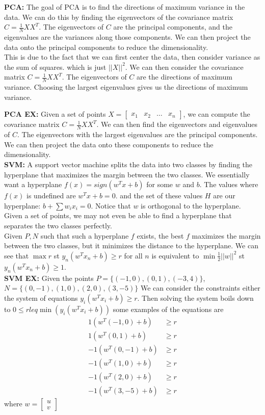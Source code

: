 \documentclass[answers,12pt,addpoints]{exam}
\begin{document}
\textbf{PCA:} The goal of PCA is to find the directions of maximum variance in the data. We can do this by finding the eigenvectors of the covariance matrix $C = \frac{1}{N} X X^T$. The eigenvectors of $C$ are the principal components, and the eigenvalues are the variances along those components. We can then project the data onto the principal components to reduce the dimensionality.\\
This is due to the fact that we can first center the data, then consider variance as the sum of squares. which is just $||X||^2$. We can then consider the covariance matrix $C = \frac{1}{N} X X^T$. The eigenvectors of $C$ are the directions of maximum variance. Choosing the largest eigenvalues gives us the directions of maximum variance. 

\textbf{PCA EX:} Given a set of points $X = \begin{bmatrix}
    x_1 & x_2 & \ldots & x_n
    \end{bmatrix}$, we can compute the covariance matrix $C = \frac{1}{N} X X^T$. We can then find the eigenvectors and eigenvalues of $C$. The eigenvectors with the largest eigenvalues are the principal components. We can then project the data onto these components to reduce the dimensionality.\\


\textbf{SVM:} A support vector machine splits the data into two classes by finding the hyperplane that maximizes the margin between the two classes. We essentially want a hyperplane $f(x) = sign(w^T x + b)$ for some $w$ and $b$. The values where $f(x)$ is undefined are $w^T x + b = 0$. and the set of these values $H$ are our hyperplane: $b + \sum w_i x_i = 0$. Notice that $w$ is orthogonal to the hyperplane. Given a set of points, we may not even be able to find a hyperplane that separates the two classes perfectly.\\
Given $P, N$ such that such a hyperplane $f$ exists, the best $f$ maximizes the margin between the two classes, but it minimizes the distance to the hyperplane. We can see that $\max r$ st $y_n (w^T x_n + b) \geq r$ for all $n$ is equivalent to $\min \frac{1}{2} ||w||^2$ st $y_n (w^T x_n + b) \geq 1$. \\

\textbf{SVM EX:} Given the points $P = \{ (-1,0), (0,1), (-3, 4)\}$, $N = \{(0,-1), (1, 0), (2,0), (3,-5)\}$ We can consider the constraints either the system of equations $y_i(w^T x_i + b) \geq r$. Then solving the system boils down to $0 \leq r leq \min (y_i (w^T x_i +b))$ some examples of the equations are 
\begin{align*}
    1(w^T (-1,0) + b) &\geq r \\
    1(w^T (0,1) + b) &\geq r \\
    -1(w^T (0,-1) + b) &\geq r \\
    -1(w^T (1,0) + b) &\geq r \\
    -1(w^T (2,0) + b) &\geq r \\
    -1(w^T (3,-5) + b) &\geq r
\end{align*} where $w = \begin{bmatrix}
    u \\
    v 
\end{bmatrix}$\\
\end{document}
